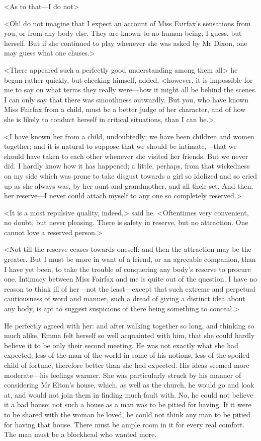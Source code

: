 <As to that—I do not\longdash>

<Oh! do not imagine that I expect an account of Miss Fairfax's sensations from you, or from any body else. They are known to no human being, I guess, but herself. But if she continued to play whenever she was asked by Mr Dixon, one may guess what one chuses.>

<There appeared such a perfectly good understanding among them all\longdash> he began rather quickly, but checking himself, added, <however, it is impossible for me to say on what terms they really were—how it might all be behind the scenes. I can only say that there was smoothness outwardly. But you, who have known Miss Fairfax from a child, must be a better judge of her character, and of how she is likely to conduct herself in critical situations, than I can be.>

<I have known her from a child, undoubtedly; we have been children and women together; and it is natural to suppose that we should be intimate,—that we should have taken to each other whenever she visited her friends. But we never did. I hardly know how it has happened; a little, perhaps, from that wickedness on my side which was prone to take disgust towards a girl so idolized and so cried up as she always was, by her aunt and grandmother, and all their set. And then, her reserve—I never could attach myself to any one so completely reserved.>

<It is a most repulsive quality, indeed,> said he. <Oftentimes very convenient, no doubt, but never pleasing. There is safety in reserve, but no attraction. One cannot love a reserved person.>

<Not till the reserve ceases towards oneself; and then the attraction may be the greater. But I must be more in want of a friend, or an agreeable companion, than I have yet been, to take the trouble of conquering any body's reserve to procure one. Intimacy between Miss Fairfax and me is quite out of the question. I have no reason to think ill of her—not the least—except that such extreme and perpetual cautiousness of word and manner, such a dread of giving a distinct idea about any body, is apt to suggest suspicions of there being something to conceal.>

He perfectly agreed with her: and after walking together so long, and thinking so much alike, Emma felt herself so well acquainted with him, that she could hardly believe it to be only their second meeting. He was not exactly what she had expected; less of the man of the world in some of his notions, less of the spoiled child of fortune, therefore better than she had expected. His ideas seemed more moderate—his feelings warmer. She was particularly struck by his manner of considering Mr Elton's house, which, as well as the church, he would go and look at, and would not join them in finding much fault with. No, he could not believe it a bad house; not such a house as a man was to be pitied for having. If it were to be shared with the woman he loved, he could not think any man to be pitied for having that house. There must be ample room in it for every real comfort. The man must be a blockhead who wanted more.

